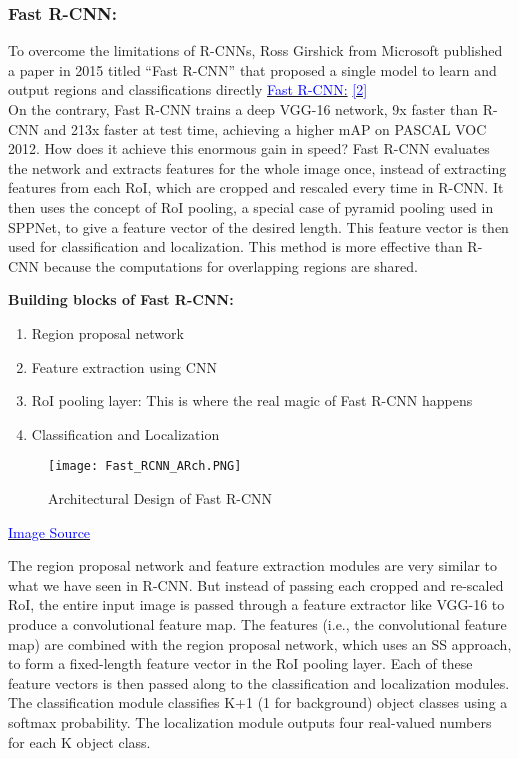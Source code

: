 \subsubsection{Fast R-CNN:} To overcome the limitations of R-CNNs, Ross Girshick from Microsoft published a paper in 2015 titled “Fast R-CNN” that proposed a single model to learn and output regions and classifications directly \href{https://arxiv.org/pdf/1504.08083.pdf}{\textcolor{blue}{Fast R-CNN:}}
\href{https://medium.com/alegion/deep-learning-for-object-detection-and-localization-using-fast-r-cnn-85d52e3928a1}{\textcolor{blue}{[2]}}\\
On the contrary, Fast R-CNN trains a deep VGG-16 network, 9x faster than R-CNN and 213x faster at test time, achieving a higher mAP on PASCAL VOC 2012. How does it achieve this enormous gain in speed? Fast R-CNN evaluates the network and extracts features for the whole image once, instead of extracting features from each RoI, which are cropped and rescaled every time in R-CNN. It then uses the concept of RoI pooling, a special case of pyramid pooling used in SPPNet, to give a feature vector of the desired length. This feature vector is then used for classification and localization. This method is more effective than R-CNN because the computations for overlapping regions are shared.
        

\textbf{Building blocks of Fast R-CNN:}
    \begin{enumerate}
        \item Region proposal network
        \item Feature extraction using CNN
        \item RoI pooling layer: This is where the real magic of Fast R-CNN happens
        \item Classification and Localization
    \end{enumerate}
        
    \begin{figure}[H]
        \centering
        \texttt{[image: Fast\_RCNN\_ARch.PNG]}
        \caption{Architectural Design of Fast R-CNN }
        \label{fig: Fast R-CNN}
    \end{figure}
\href{https://www.mathworks.com/help/vision/ug/getting-started-with-r-cnn-fast-r-cnn-and-faster-r-cnn.html#d117e11449}{\textcolor{blue}{Image Source}}
        
The region proposal network and feature extraction modules are very similar to what we have seen in R-CNN. But instead of passing each cropped and re-scaled RoI, the entire input image is passed through a feature extractor like VGG-16 to produce a convolutional feature map. The features (i.e., the convolutional feature map) are combined with the region proposal network, which uses an SS approach, to form a fixed-length feature vector in the RoI pooling layer. Each of these feature vectors is then passed along to the classification and localization modules. The classification module classifies K+1 (1 for background) object classes using a softmax probability. The localization module outputs four real-valued numbers for each K object class. \cite{girshick2015fast}
